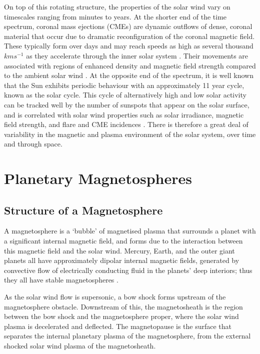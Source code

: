 On top of this rotating structure, the properties of the solar wind vary on timescales ranging from minutes to years. At the shorter end of the time spectrum, coronal mass ejections (CMEs) are dynamic outflows of dense, coronal material that occur due to dramatic reconfiguration of the coronal magnetic field. These typically form over days and may reach speeds as high as several thousand $\si{km s^{-1}}$ as they accelerate through the inner solar system \citep{russell2016}. Their movements are associated with regions of enhanced density and magnetic field strength compared to the ambient solar wind \citep{odstrcil1999}. At the opposite end of the spectrum, it is well known that the Sun exhibits periodic behaviour with an approximately 11 year cycle, known as the solar cycle. This cycle of alternatively high and low solar activity can be tracked well by the number of sunspots that appear on the solar surface, and is correlated with solar wind properties such as solar irradiance, magnetic field strength, and flare and CME incidences \citep{hathaway2015}. There is therefore a great deal of variability in the magnetic and plasma environment of the solar system, over time and through space.

\section{Planetary Magnetospheres}
\subsection{Structure of a Magnetosphere}
A magnetosphere is a `bubble' of magnetised plasma that surrounds a planet with a significant internal magnetic field, and forms due to the interaction between this magnetic field and the solar wind. Mercury, Earth, and the outer giant planets all have approximately dipolar internal magnetic fields, generated by convective flow of electrically conducting fluid in the planets' deep interiors; thus they all have stable magnetospheres \citep{kivelson2014book}.

As the solar wind flow is supersonic, a bow shock forms upstream of the magnetosphere obstacle. Downstream of this, the magnetosheath is the region between the bow shock and the magnetosphere proper, where the solar wind plasma is decelerated and deflected. The magnetopause is the surface that separates the internal planetary plasma of the magnetosphere, from the external shocked solar wind plasma of the magnetosheath. 

